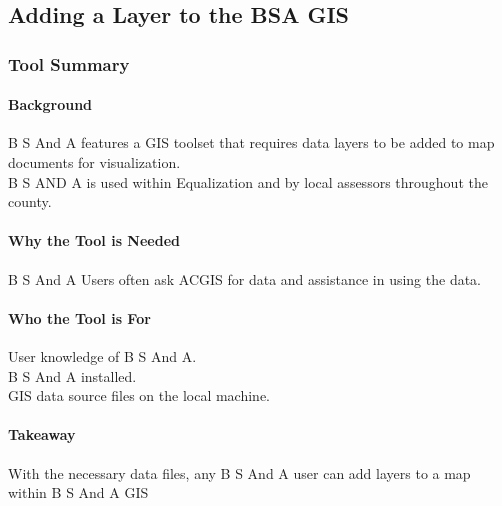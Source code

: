 %
%
%
%
% 
\subsection{Adding a Layer to the BSA GIS}
\subsubsection{Tool Summary}
\begin{adjmulticols}{2}{\innerMar}{\outerMar}
\paragraph{Background}
B S And A features a GIS toolset that requires data layers to be added to map documents for visualization.\\

\noindent B S AND A is used within Equalization and by local assessors throughout the county.
\paragraph{Why the Tool is Needed}
B S And A Users often ask ACGIS for data and assistance in using the data.
\paragraph{Who the Tool is For}
User knowledge of B S And A.\\

\noindent B S And A installed.\\

\noindent GIS data source files on the local machine.
\paragraph{Takeaway}
With the necessary data files, any B S And A user can add layers to a map within B S And A GIS
\end{adjmulticols}
\clearpage


